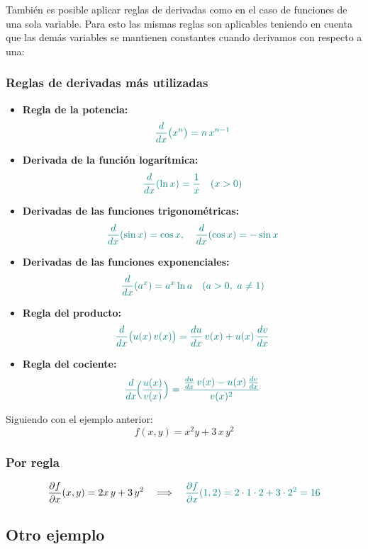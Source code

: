 \documentclass{article}
\begin{document}
También es posible aplicar reglas de derivadas como en el caso de funciones de una sola variable. Para esto las mismas reglas son aplicables teniendo en cuenta que las demás variables se mantienen constantes cuando derivamos con respecto a una:



\subsubsection*{Reglas de derivadas más utilizadas}
\begin{itemize}
  \item \textbf{Regla de la potencia:}
    \[
    \color{teal}
    \frac{d}{dx}\bigl(x^{n}\bigr)
    =n\,x^{n-1}
    \]
  \item \textbf{Derivada de la función logarítmica:}
    \[
    \color{teal}
\frac{d}{dx}(\ln x)=\frac{1}{x}\quad (x>0)
    \]
  \item \textbf{Derivadas de las funciones trigonométricas:}
    \[
    \color{teal}
      \frac{d}{dx}(\sin x)=\cos x,
      \quad
      \frac{d}{dx}(\cos x)=-\sin x
    \]
  \item \textbf{Derivadas de las funciones exponenciales:}
    \[
    \color{teal}
     \frac{d}{dx}(a^{x})=a^{x}\ln a\quad (a>0,\ a\neq 1)
    \]
  \item \textbf{Regla del producto:}
    \[
    \color{teal}
    \frac{d}{dx}\bigl(u(x)\,v(x)\bigr)
    =\frac{du}{dx}\,v(x) + u(x)\,\frac{dv}{dx}
    \]
  \item \textbf{Regla del cociente:}
    \[
    \color{teal}
    \frac{d}{dx}\!\Bigl(\frac{u(x)}{v(x)}\Bigr)
    =\frac{\frac{du}{dx}\,v(x) - u(x)\,\frac{dv}{dx}}{v(x)^{2}}
    \]
\end{itemize}



Siguiendo con el ejemplo anterior: 
\[
f(x,y)=x^{2}y + 3\,x\,y^{2}
\]


\subsubsection*{Por regla}
\[
\frac{\partial f}{\partial x}(x,y)
=2x\,y + 3\,y^{2}
\quad\Longrightarrow\quad \color{teal}
\frac{\partial f}{\partial x}(1,2)
=2\cdot1\cdot2 + 3\cdot2^{2}
=16
\]





\subsection*{Otro ejemplo}
\end{document}
